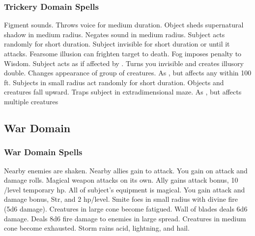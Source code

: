 \subsubsection{Trickery Domain Spells}
\begin{spelllist}
   Figment sounds.
   Throws voice for medium duration.
   Object sheds supernatural shadow in medium radius.
   Negates sound in medium radius.
   Subject acts randomly for short duration.
   Subject invisible for short duration or until it attacks.
  \spellhead[4]{}
   Fearsome illusion can frighten target to death.
   Fog imposes  penalty to Wisdom.
   Subject acts as if affected by .
   Turns you invisible and creates illusory double.
   Changes appearance of group of creatures.
   As , but affects any within 100 ft.
  \spellhead[7]{}
   Subjects in small radius act randomly for short duration.
   Objects and creatures fall upward.
   Traps subject in extradimensional maze.
   As , but affects multiple creatures
\end{spelllist}

\subsection{War Domain}
\subsubsection{War Domain Spells}
\begin{spelllist}
   Nearby enemies are shaken.
   Nearby allies gain  to attack.
   You gain  on attack and damage rolls.
   Magical weapon attacks on its own.
   Ally gains  attack bonus, 10 /level temporary hp.
  \spellhead[3]{}
   All of subject's equipment is magical.
   You gain attack and damage bonus,  Str, and 2 hp/level.
   Smite foes in small radius with divine fire (5d6 damage).
   Creatures in large cone become fatigued.
   Wall of blades deals 6d6 damage.
  \spellhead[6]{}
  \spellhead[7]{}
  \spellhead[7]{}
   Deals 8d6 fire damage to enemies in large spread.
   Creatures in medium cone become exhausted.  
  \spellhead[9]{}
   Storm rains acid, lightning, and hail.
\end{spelllist}

